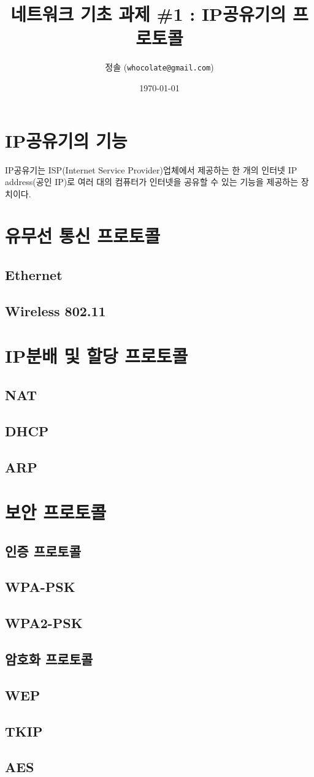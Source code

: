 \documentclass[12pt]{article}
\title{네트워크 기초 과제 \#1 : IP공유기의 프로토콜} %
\author{정솔 (\texttt{whocolate@gmail.com})} %
\date{\today} %
\begin{document}
\maketitle %

\section{IP공유기의 기능}

IP공유기는 ISP(Internet Service Provider)업체에서 
제공하는 한 개의 인터넷 IP address(공인 IP)로 여러 대의 컴퓨터가 인터넷을 공유할 
수 있는 기능을 제공하는 장치이다. 

\section{유무선 통신 프로토콜}
\subsection{Ethernet}
\subsection{Wireless 802.11}

\section{IP분배 및 할당 프로토콜}
\subsection{NAT}
\subsection{DHCP}
\subsection{ARP}


\section{보안 프로토콜}
\subsection*{인증 프로토콜}
\subsection{WPA-PSK}
\subsection{WPA2-PSK}
\subsection*{암호화 프로토콜}
\subsection{WEP}
\subsection{TKIP}
\subsection{AES}
\end{document}

